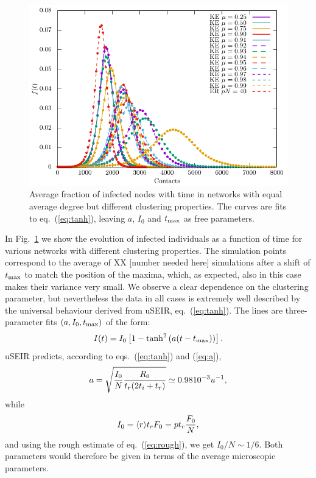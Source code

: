 \documentclass[a4paper,oneside,11pt]{article}
\newcommand{\mycomment}[1]{\textcolor[rgb]{0.75,0,0}{[#1]}}
\begin{document}
\begin{figure}[htbp]
\centering
 \includegraphics[width=.9\linewidth]{uSEIR.pdf}
\caption{Average fraction of infected nodes with time in networks with equal average degree but different clustering properties. The curves are fits  to eq.~(\ref{eq:tanh}), leaving $a$, $I_0$ and $t_{\rm max}$ as free parameters. }
\label{fig:net}
\end{figure}
In Fig.~\ref{fig:net} we show the evolution of infected individuals as a function of time for various networks with different clustering properties. The simulation points correspond to the average of XX \mycomment{number needed here} simulations after a shift of $t_{\rm max}$ to match the position of the maxima, which, as expected, also in this case makes their variance very  small. We observe a clear dependence on the clustering parameter, but nevertheless the data in all cases is extremely well described by  the universal behaviour  derived from uSEIR, eq.~(\ref{eq:tanh}). The lines
are three-parameter fits $(a, I_0, t_{\rm max})$ of the form:
\begin{eqnarray}
I(t)= I_0 \left[ 1 - {\rm tanh}^2 \left(a (t-t_{\rm max}) \right)\right].
\label{eq:iasym}
\end{eqnarray}
uSEIR predicts, according to eqs.~(\ref{eq:tanh}) and (\ref{eq:a}),
\begin{eqnarray}
a=  \sqrt{{I_0\over N} { R_0 \over  t_r(2 t_i + t_r)}} \simeq 0.98 10^{-3} u^{-1},
\label{eq:a}
\end{eqnarray}
while 
\begin{eqnarray}
 I_0 = \langle r \rangle t_r F_0 = p t_r {F_0\over N},
 \end{eqnarray}
 and using the rough estimate of eq.~(\ref{eq:rough}), we get $I_0/N \sim 1/6$. 
 Both parameters would therefore be given in terms of the average microscopic parameters. 
 
\end{document}
